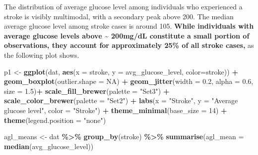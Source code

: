 \documentclass[
]{article}
\newenvironment{Shaded}{\begin{snugshade}}{\end{snugshade}}
\newcommand{\AttributeTok}[1]{\textcolor[rgb]{0.13,0.29,0.53}{#1}}
\newcommand{\ConstantTok}[1]{\textcolor[rgb]{0.56,0.35,0.01}{#1}}
\newcommand{\DecValTok}[1]{\textcolor[rgb]{0.00,0.00,0.81}{#1}}
\newcommand{\FloatTok}[1]{\textcolor[rgb]{0.00,0.00,0.81}{#1}}
\newcommand{\FunctionTok}[1]{\textcolor[rgb]{0.13,0.29,0.53}{\textbf{#1}}}
\newcommand{\NormalTok}[1]{#1}
\newcommand{\OtherTok}[1]{\textcolor[rgb]{0.56,0.35,0.01}{#1}}
\newcommand{\SpecialCharTok}[1]{\textcolor[rgb]{0.81,0.36,0.00}{\textbf{#1}}}
\newcommand{\StringTok}[1]{\textcolor[rgb]{0.31,0.60,0.02}{#1}}
\begin{document}
The distribution of average glucose level among individuals who
experienced a stroke is visibly multimodal, with a secondary peak above
200. The median average glucose level among stroke cases is around 105.
\textbf{While individuals with average glucose levels above
\textasciitilde{} 200mg/dL constitute a small portion of observations,
they account for approximately 25\% of all stroke cases,} as the
following plot shows.

\begin{Shaded}
\begin{Highlighting}[]
\NormalTok{p1 }\OtherTok{\textless{}{-}} \FunctionTok{ggplot}\NormalTok{(dat, }\FunctionTok{aes}\NormalTok{(}\AttributeTok{x =}\NormalTok{ stroke, }\AttributeTok{y =}\NormalTok{ avg\_glucose\_level, }\AttributeTok{color=}\NormalTok{stroke)) }\SpecialCharTok{+} 
      \FunctionTok{geom\_boxplot}\NormalTok{(}\AttributeTok{outlier.shape =} \ConstantTok{NA}\NormalTok{) }\SpecialCharTok{+}
      \FunctionTok{geom\_jitter}\NormalTok{(}\AttributeTok{width =} \FloatTok{0.2}\NormalTok{, }\AttributeTok{alpha =} \FloatTok{0.6}\NormalTok{, }\AttributeTok{size =} \FloatTok{1.5}\NormalTok{)}\SpecialCharTok{+}
      \FunctionTok{scale\_fill\_brewer}\NormalTok{(}\AttributeTok{palette =} \StringTok{"Set3"}\NormalTok{) }\SpecialCharTok{+}
      \FunctionTok{scale\_color\_brewer}\NormalTok{(}\AttributeTok{palette =} \StringTok{"Set2"}\NormalTok{) }\SpecialCharTok{+}
      \FunctionTok{labs}\NormalTok{(}\AttributeTok{x =} \StringTok{"Stroke"}\NormalTok{, }\AttributeTok{y =} \StringTok{"Average glucose level"}\NormalTok{, }\AttributeTok{color =} \StringTok{"Stroke"}\NormalTok{) }\SpecialCharTok{+}
      \FunctionTok{theme\_minimal}\NormalTok{(}\AttributeTok{base\_size =} \DecValTok{14}\NormalTok{) }\SpecialCharTok{+}
      \FunctionTok{theme}\NormalTok{(}\AttributeTok{legend.position =} \StringTok{"none"}\NormalTok{)  }


\NormalTok{agl\_means }\OtherTok{\textless{}{-}}\NormalTok{ dat }\SpecialCharTok{\%\textgreater{}\%} \FunctionTok{group\_by}\NormalTok{(stroke) }\SpecialCharTok{\%\textgreater{}\%} \FunctionTok{summarise}\NormalTok{(}\AttributeTok{agl\_mean =} \FunctionTok{median}\NormalTok{(avg\_glucose\_level)) }


\end{Highlighting}
\end{Shaded}
\end{document}
